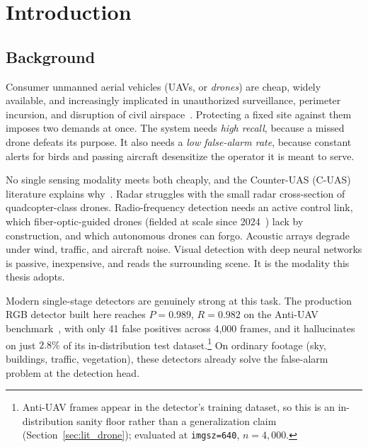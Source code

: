 \chapter{Introduction}
\label{ch:introduction}

\section{Background}

Consumer unmanned aerial vehicles (UAVs, or \emph{drones}) are cheap, widely available, and increasingly implicated in unauthorized surveillance, perimeter incursion, and disruption of civil airspace~\cite{shi2018counteruas,taha2019drone,samaras2019deep}. Protecting a fixed site against them imposes two demands at once. The system needs \emph{high recall}, because a missed drone defeats its purpose. It also needs a \emph{low false-alarm rate}, because constant alerts for birds and passing aircraft desensitize the operator it is meant to serve.

No single sensing modality meets both cheaply, and the Counter-UAS (C-UAS) literature explains why~\cite{samaras2019deep}. Radar struggles with the small radar cross-section of quadcopter-class drones. Radio-frequency detection needs an active control link, which fiber-optic-guided drones (fielded at scale since 2024~\cite{csis2025dronewar}) lack by construction, and which autonomous drones can forgo. Acoustic arrays degrade under wind, traffic, and aircraft noise. Visual detection with deep neural networks is passive, inexpensive, and reads the surrounding scene. It is the modality this thesis adopts.

Modern single-stage detectors are genuinely strong at this task. The production RGB detector built here reaches $P=0.989$, $R=0.982$ on the Anti-UAV benchmark~\cite{jiang2021antiuav}, with only 41 false positives across 4{,}000 frames, and it hallucinates on just $2.8\%$ of its in-distribution test dataset.\footnote{Anti-UAV frames appear in the detector's training dataset, so this is an in-distribution sanity floor rather than a generalization claim (Section~\ref{sec:lit_drone}); evaluated at \texttt{imgsz=640}, $n=4{,}000$.} On ordinary footage (sky, buildings, traffic, vegetation), these detectors already solve the false-alarm problem at the detection head.

